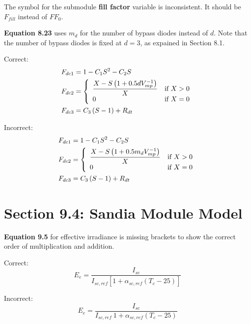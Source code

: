 \documentclass[report]{nrel}
\begin{document}
The symbol for the submodule \textbf{fill factor} variable is inconsistent. It should be $F_{fill}$ instead of $\mathit{FF}_0$.

\textbf{Equation 8.23} uses $m_d$ for the number of bypass diodes instead of $d$. Note that the number of bypass diodes is fixed at $d=3$, as expained in Section 8.1.

Correct:
\begin{align*}
F_{dc1} &= 1-C_1S^2-C_2S \notag\\ %
F_{dc2} &= 
\left\{
   \begin{array}{ll}
      \dfrac{X-S\left(1+0.5 d V^{-1}_{mp}\right)}{X} & \text{if $X>0$}\\
      0 & \text{if $X=0$}\\
   \end{array}
\right. \notag\\ %
F_{dc3} &= C_3\left(S-1\right)+R_{dt} %
\end{align*}

Incorrect:
\begin{align*}
F_{dc1} &= 1-C_1S^2-C_2S \notag\\ %
F_{dc2} &= 
\left\{
   \begin{array}{ll}
      \dfrac{X-S\left(1+0.5 m_d V^{-1}_{mp}\right)}{X} & \text{if $X>0$}\\
      0 & \text{if $X=0$}\\
   \end{array}
\right. \notag\\ %
F_{dc3} &= C_3\left(S-1\right)+R_{dt} %
\end{align*}

\section*{Section 9.4: Sandia Module Model}

\textbf{Equation 9.5} for effective irradiance is missing brackets to show the correct order of multiplication and addition.

Correct:
\begin{equation*}
E_e = \frac{I_{sc}}{I_{sc,ref} \left[1 + \alpha_{sc,ref} (T_c - 25)\right]}
\end{equation*}

Incorrect:
\begin{equation*}
E_e = \frac{I_{sc}}{I_{sc,ref}~1 + \alpha_{sc,ref} (T_c - 25)}
\end{equation*}
\end{document}
